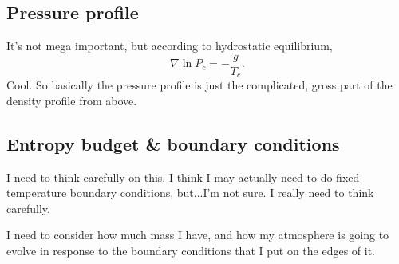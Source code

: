 \documentclass[aps, pre, onecolumn, nofootinbib, notitlepage, groupedaddress, amsfonts, amssymb, amsmath, longbibliography]{revtex4-1}
\newcommand{\grad}{\ensuremath{\nabla}}
\begin{document}
\subsection{Pressure profile}
It's not mega important, but according to hydrostatic equilibrium,
\begin{equation}
\grad \ln P_c = -\frac{g}{T_c}.
\end{equation}
Cool.  So basically the pressure profile is just the complicated, gross part of the density
profile from above.

\subsection{Entropy budget \& boundary conditions}
I need to think carefully on this.  I think I may actually need to do fixed temperature
boundary conditions, but...I'm not sure.  I really need to think carefully.

I need to consider how much mass I have, and how my atmosphere is going to evolve in response
to the boundary conditions that I put on the edges of it.


\end{document}
